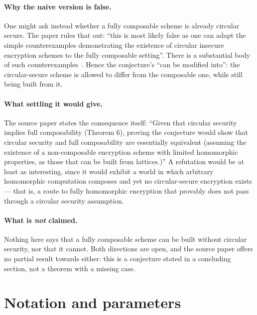 \documentclass{aicr-conjecture}
\begin{document}
\paragraph{Why the naive version is false.}
One might ask instead whether a fully composable scheme is already
circular secure. The paper rules that out: ``this is most likely false
as one can adapt the simple counterexamples demonstrating the existence
of circular insecure encryption schemes to the fully composable
setting''. There is a substantial body of such
counterexamples~\cite{KRW15,KW16,AP16,GKW17a,GKW17b,HK17}. Hence the
conjecture's ``can be modified into'': the circular-secure scheme is
allowed to differ from the composable one, while still being built from
it.

\paragraph{What settling it would give.}
The source paper states the consequence itself: ``Given that circular
security implies full composability (Theorem 6), proving the conjecture
would show that circular security and full composability are
essentially equivalent (assuming the existence of a non-composable
encryption scheme with limited homomorphic properties, as those that
can be built from lattices.)'' A refutation would be at least as
interesting, since it would exhibit a world in which arbitrary
homomorphic computation composes and yet no circular-secure encryption
exists --- that is, a route to fully homomorphic encryption that
provably does not pass through a circular security assumption.

\paragraph{What is \emph{not} claimed.}
Nothing here says that a fully composable scheme can be built without
circular security, nor that it cannot. Both directions are open, and
the source paper offers no partial result towards either: this is a
conjecture stated in a concluding section, not a theorem with a missing
case.

\section{Notation and parameters}\label{sec:notation}
\end{document}
